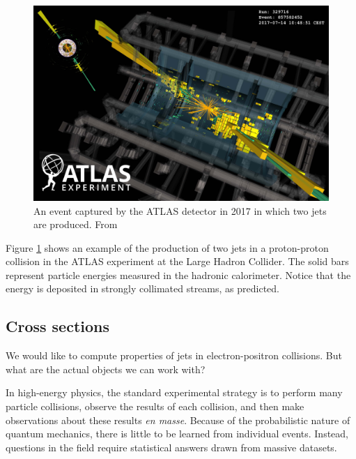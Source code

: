 \documentclass[../thesis.tex]{subfiles}
\begin{document}
	\begin{figure}
	\begin{center}
		\includegraphics[width=\textwidth]{figures/DijetHighMass9.3TeV-VP1-nocone_small.jpg}
		\caption{\label{technical-fig:dijet}An event captured by the ATLAS detector in 2017 in which two jets are produced. From \cite{atlas_collaboration_event_nodate}}
	\end{center}
	\end{figure}

	Figure \ref{technical-fig:dijet} shows an example of the production of two jets in a proton-proton collision in the ATLAS experiment at the Large Hadron Collider. The solid bars represent particle energies measured in the hadronic calorimeter. Notice that the energy is deposited in strongly collimated streams, as predicted.

\subsection{Cross sections}
	We would like to compute properties of jets in electron-positron collisions. But what are the actual objects we can work with?

	In high-energy physics, the standard experimental strategy is to perform many particle collisions, observe the results of each collision, and then make observations about these results \textit{en masse}. Because of the probabilistic nature of quantum mechanics, there is little to be learned from individual events. Instead, questions in the field require statistical answers drawn from massive datasets.
\end{document}
